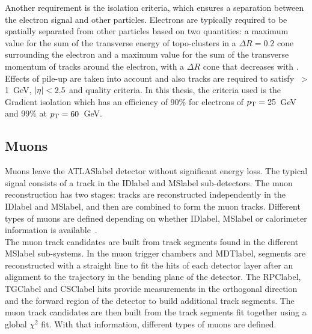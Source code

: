 Another requirement is the isolation criteria, which ensures a separation between the electron signal and other particles. Electrons are typically required to be spatially separated from other particles based on two quantities: a maximum value for the sum of the transverse energy of topo-clusters in a $\Delta R=0.2$ cone surrounding the electron and a maximum value for the sum of the transverse momentum of tracks around the electron, with a $\Delta R$ cone that decreases with \pT. Effects of pile-up are taken into account and also tracks are required to satisfy \pT\ > 1~GeV, $\abs{\eta}<2.5$ and quality criteria. In this thesis, the criteria used is the Gradient isolation which has an efficiency of 90\% for electrons of $p_{\text{T}} = 25$~GeV and 99\% at $p_{\text{T}} = 60$~GeV.

\subsection{Muons}

Muons leave the \acrshort{ATLASlabel} detector without significant energy loss. The typical signal consists of a track in the \acrshort{IDlabel} and \acrshort{MSlabel} sub-detectors. The muon reconstruction has two stages: tracks are reconstructed independently in the \acrshort{IDlabel} and \acrshort{MSlabel}, and then are combined to form the muon tracks. Different types of muons are defined depending on whether \acrshort{IDlabel}, \acrshort{MSlabel} or calorimeter information is available~\cite{performancemu}.\\

The muon track candidates are built from track segments found in the different \acrshort{MSlabel} sub-systems. In the muon trigger chambers and \acrshort{MDTlabel}, segments are reconstructed with a straight line to fit the hits of each detector layer after an alignment to the trajectory in the bending plane of the detector. The \acrshort{RPClabel}, \acrshort{TGClabel} and \acrshort{CSClabel} hits provide measurements in the orthogonal direction and the forward region of the detector to build additional track segments. The muon track candidates are then built from the track segments fit together using a global $\chi^2$ fit. With that information, different types of muons are defined.\\

